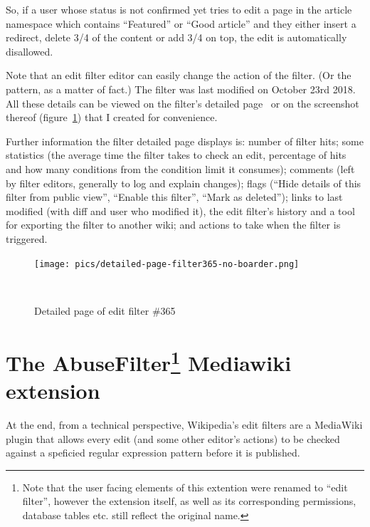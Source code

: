 So, if a user whose status is not confirmed yet tries to edit a page in the article namespace which contains ``Featured'' or ``Good article'' and they either insert a redirect, delete 3/4 of the content or add 3/4 on top, the edit is automatically disallowed.

Note that an edit filter editor can easily change the action of the filter. (Or the pattern, as a matter of fact.)
The filter was last modified on October 23rd 2018.
All these details can be viewed on the filter's detailed page~\cite{Wikipedia:EditFilter365}
or on the screenshot thereof (figure~\ref{fig:filter-details}) that I created for convenience.

Further information the filter detailed page displays is:
number of filter hits;
some statistics (the average time the filter takes to check an edit, percentage of hits and how many conditions from the condition limit it consumes);%
comments (left by filter editors, generally to log and explain changes);
flags (``Hide details of this filter from public view'', ``Enable this filter'', ``Mark as deleted'');
links to last modified (with diff and user who modified it), the edit filter's history and a tool for exporting the filter to another wiki;
and actions to take when the filter is triggered.

\begin{figure}
\centering
  \texttt{[image: pics/detailed-page-filter365-no-boarder.png]}
  \caption{Detailed page of edit filter \#365}~\label{fig:filter-details}
\end{figure}


\section{The AbuseFilter\footnote{Note that the user facing elements of this extention were renamed to ``edit filter'', however the extension itself, as well as its corresponding permissions, database tables etc. still reflect the original name.} Mediawiki extension}
\label{sec:mediawiki-ext}

At the end, from a technical perspective, Wikipedia's edit filters are a MediaWiki plugin that allows every edit (and some other editor's actions) to be checked against a speficied regular expression pattern before it is published.

